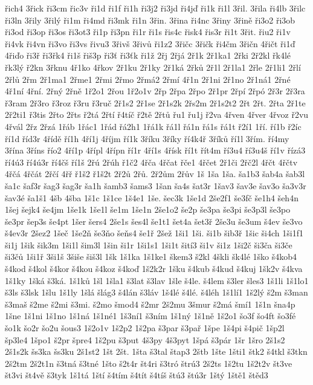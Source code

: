 {řich4
3řick
ři3cm
řic3v
ři1d
ři1f
ři1h
ři3j2
ři3jd
ři4jď
ři1k
ři1l
3řil.
3řila
ři4lb
3řilc
ři3ln
3řily
3řilý
ři1m
ři4md
ři3mk
ři1n
3řin.
3řina
ři4nc
3řiny
3řině
ři3o2
ři3ob
ři3od
ři3op
ři3os
ři3ot3
ři1p
ři3pn
ři1r
ři1s
řis4c
řisk4
řis3r
ři1t
3řit.
řiu2
ři1v
ři4vk
ři4vn
ři3vo
ři3vs
řivu3
3řivš
3řivů
ři1z2
3řičc
3řičk
ři4čm
3řičn
4řičt
ři1ď
4řiďo
ři3ř
ři3řk4
ři1š
řiš3p
ři3ť
ři3ťk
ři1ž
2řj
2řjá
2ř1k
2ř1ka1
2řki
2ř2kl
řk4lé
řk3lý
ř2kn
3řknu
4ř1ko
4řkov
2ř1ku
2ř1ky
2ř1ká
2řků
2ř1l
2ř1la1
2řle
2ř1li1
2řlí
2řlů
2řm
2ř1ma1
2řme1
2řmi
2řmo
2řmá2
2řmí
4ř1n
2ř1ni
2ř1no
2ř1ná1
2řné
4ř1ní
4řní.
2řný
2řně
1ř2o1
2řou
1ř2o1v
2řp
2řpa
2řpo
2ř1pr
2řpí
2řpó
2ř3r
2ř3ra
ř3ram
2ř3ro
ř3roz
ř3ru
ř3ruč
2ř1s2
2ř1se
2ř1s2k
2řs2m
2ř1s2t2
2řt
2řt.
2řta
2ř1te
2ř2ti1
ř3tis
2řto
2řts
ř2tá
2řtí
ř4tíč
ř2tě
2řtů
řu1
řu1j
ř2va
4řven
4řver
4řvoz
ř2vu
4řvál
2řz
2řzá
1řáb
1řác1
1řád
řá2h1
1řá1k
řá1l
řá1n
řá1s
řá1t
ř2í1
1ří.
ří1b
ř2íc
ří1d
říd3r
4řídě
ří1h
4ří1j
4říjm
ří1k
3říku
3říky
ří4k4ř
3říků
ří1l
3řím.
ří4my
3řína
3říns
řío2
4ří1p
4řípl
4řípn
ří1r
4ří1s
4řísk
ří1t
řít4m
ří3u4
ří3u4š
ří1v
řízá3
ří4ú3
ří4ú3r
ří4čš
ří1š
2řú
2řúh
ř1č2
4řča
4řčat
řče1
4řčet
2ř1či
2řč2l
4řčt
4řčtv
4řčá
4řčát
2řčí
4řř
ř1š2
ř1š2t
2ř2ů
2řů.
2ř2ům
2řův
1š
1ša
1ša.
ša1b3
šab4a
šab3l
ša1c
šaf3r
šag3
šag3r
ša1h
šamb3
šams3
1šan
ša4s
šat3r
1šav3
šav3e
šav3o
ša3v3r
šav3é
ša1š1
4šb
4šba
1š1c
1š1ce
1š4e1
1še.
šec3k
1še1d
2še2f1
še3fč
še1h4
šeh4n
1šej
šejk4
še4jm
1še1k
1še1l
še1m
1še1n
2še1o2
še2p
še3pa
še3pi
še3p3l
še3po
še3pr
šep3s
še4pt
1šer
šers4
2še1s
šes4l
še1t1
šet4a
šet3ř
2še3u
še3um
š4ev
še3vo
š4ev3r
2šez2
1šeč
1še2ň
še3ňo
šeňs4
še1ř
2šež
1ši1
1ši.
ši1b
šib3ř
1šic
ši4ch
1ši1f1
ši1j
1šik
šik3m
1ši1l
šim3l
1šin
ši1r
1ši1s1
1ši1t
šití3
ši1v
ši1z
1ši2č
ši3ča
ši3če
ši3čů
1ši1ř
3ši1š
3šiše
šiš3l
1šk
1š1ka
1š1ke1
škem3
š2kl
4škli
šk4lé
1ško
š4kob4
š4kod
š4kol
š4kor
š4kou
š4koz
š4koď
1š2k2r
1šku
š4kub
š4kud
š4kuj
1šk2v
š4kva
1š1ky
1šká
š3ká.
1š1ků
1šl
1šla1
š3lat
š3lav
1šle
š4le.
š4lem
š3ler
šles3
1š1li
1š1lo1
š3ls
š3lsk
1šlu
1š1ly
1šlá
šlág3
š4lán
š3láv
1š4lé
š4lé.
š4léh
1š1lí1
1š2lý
š2m
š3man
š3maš
š2me
š2mi
š3mi.
š2mo
šmod4
š2mr
2š2mu
3šmur
š2má
šmí1
1š1n
šna4p
1šne
1š1ni
1š1no
1š1ná
1š1né1
1š3ní1
š3ním
1š1ný
1š1ně
1š2o1
šo3f
šo4ft
šo3fé
šo1k
šo2r
šo2u
šous3
1š2o1v
1š2p2
1š2pa
š3par
š3pař
1špe
1š4pi
š4pič
1šp2l
šp3le4
1špo1
š2pr
špre4
1š2pu
š3put
4š3py
4š3pyt
1špá
š3pár
1šr
1šro
2š1s2
2š1s2k
šs3ka
šs3ku
2š1st2
1št
2št.
1šta
š3tal
štap3
2štb
1šte
1šti1
štk2
š4tkl
š3tkn
2š2tm
2š2t1n
š3tná
š3tné
1što
š2t4r
št4ri
š3tró
štrú3
2š2ts
1š2tu
1š2t2v
št3ve
št3vi
št4vě
š3tyk
1š1tá
1ští
š4tím
š4tít
š4tíš
štú3
štú3r
1štý
1ště1
štěd3
}
